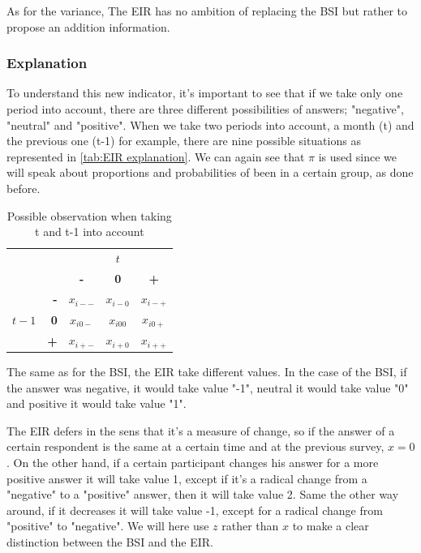 \documentclass[12pt,a4paper,oneside]{book}
\begin{document}
As for the variance, The EIR has no ambition of replacing the BSI but rather to propose an addition information.

\subsubsection{Explanation}

To understand this new indicator, it's important to see that if we take only one period into account, there are three different possibilities of answers; "negative", "neutral" and "positive". 
When we take two periods into account, a month (t) and the previous one (t-1) for example, there are nine possible situations as represented in \autoref{tab:EIR explanation}. 
We can again see that $\pi$ is used since we will speak about proportions and probabilities of been in a certain group, as done before.

\begin{table}[H]
    \centering
    \begin{tabular}{r | r | c c c | }
    \multicolumn{1}{r}{} & \multicolumn{1}{r}{} &	\multicolumn{3}{c}{$t$} \\ \cline{3-5}
    \multicolumn{1}{r}{} & 		& \textbf{-} & \textbf{0} & \textbf{+} \\ \cline{2-5}
    		&    \textbf{-} & $x_{i--}$	& $x_{i-0}$	& $x_{i-+}$ \\ 
    $t-1$ & \textbf{0} & $x_{i0-}$	& $x_{i00}$	& $x_{i0+}$	\\
    		&    \textbf{+} & $x_{i+-}$	& $x_{i+0}$	& $x_{i++}$ \\ \cline{2-5}
    \end{tabular}
    \caption{Possible observation when taking t and t-1 into account}
    \label{tab:EIR explanation}
\end{table}{}

The same as for the BSI, the EIR take different values. In the case of the BSI, if the answer was negative, it would take value "-1", neutral it would take value "0" and positive it would take value "1".

The EIR defers in the sens that it's a measure of change, so if the answer of a certain respondent is the same at a certain time and at the previous survey, $x=0$. 
On the other hand, if a certain participant changes his answer for a more positive answer it will take value 1, except if it's a radical change from a "negative" to a "positive" answer, then it will take value 2.
Same the other way around, if it decreases it will take value -1, except for a radical change from "positive" to "negative".
We will here use $z$ rather than $x$ to make a clear distinction between the BSI and the EIR.
\end{document}
